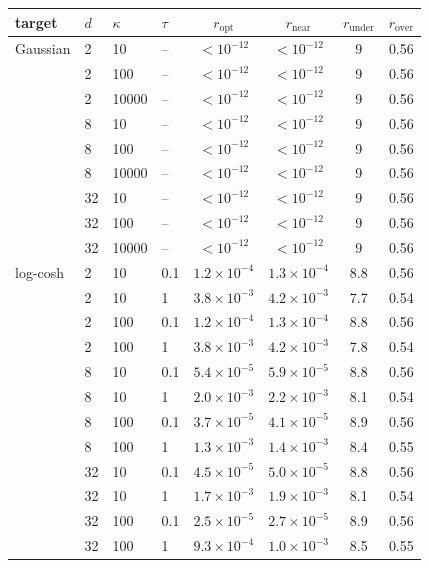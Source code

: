 \begin{tabular}{llll cccc}
\toprule
target & $d$ & $\kappa$ & $\tau$ & $r_{\mathrm{opt}}$ & $r_{\mathrm{near}}$ & $r_{\mathrm{under}}$ & $r_{\mathrm{over}}$ \\
\midrule
Gaussian & 2 & 10 & -- & $<\!10^{-12}$ & $<\!10^{-12}$ & 9 & 0.56 \\
 & 2 & 100 & -- & $<\!10^{-12}$ & $<\!10^{-12}$ & 9 & 0.56 \\
 & 2 & 10000 & -- & $<\!10^{-12}$ & $<\!10^{-12}$ & 9 & 0.56 \\
 & 8 & 10 & -- & $<\!10^{-12}$ & $<\!10^{-12}$ & 9 & 0.56 \\
 & 8 & 100 & -- & $<\!10^{-12}$ & $<\!10^{-12}$ & 9 & 0.56 \\
 & 8 & 10000 & -- & $<\!10^{-12}$ & $<\!10^{-12}$ & 9 & 0.56 \\
 & 32 & 10 & -- & $<\!10^{-12}$ & $<\!10^{-12}$ & 9 & 0.56 \\
 & 32 & 100 & -- & $<\!10^{-12}$ & $<\!10^{-12}$ & 9 & 0.56 \\
 & 32 & 10000 & -- & $<\!10^{-12}$ & $<\!10^{-12}$ & 9 & 0.56 \\
\midrule
log-cosh & 2 & 10 & 0.1 & $1.2\times10^{-4}$ & $1.3\times10^{-4}$ & 8.8 & 0.56 \\
 & 2 & 10 & 1 & $3.8\times10^{-3}$ & $4.2\times10^{-3}$ & 7.7 & 0.54 \\
 & 2 & 100 & 0.1 & $1.2\times10^{-4}$ & $1.3\times10^{-4}$ & 8.8 & 0.56 \\
 & 2 & 100 & 1 & $3.8\times10^{-3}$ & $4.2\times10^{-3}$ & 7.8 & 0.54 \\
 & 8 & 10 & 0.1 & $5.4\times10^{-5}$ & $5.9\times10^{-5}$ & 8.8 & 0.56 \\
 & 8 & 10 & 1 & $2.0\times10^{-3}$ & $2.2\times10^{-3}$ & 8.1 & 0.54 \\
 & 8 & 100 & 0.1 & $3.7\times10^{-5}$ & $4.1\times10^{-5}$ & 8.9 & 0.56 \\
 & 8 & 100 & 1 & $1.3\times10^{-3}$ & $1.4\times10^{-3}$ & 8.4 & 0.55 \\
 & 32 & 10 & 0.1 & $4.5\times10^{-5}$ & $5.0\times10^{-5}$ & 8.8 & 0.56 \\
 & 32 & 10 & 1 & $1.7\times10^{-3}$ & $1.9\times10^{-3}$ & 8.1 & 0.54 \\
 & 32 & 100 & 0.1 & $2.5\times10^{-5}$ & $2.7\times10^{-5}$ & 8.9 & 0.56 \\
 & 32 & 100 & 1 & $9.3\times10^{-4}$ & $1.0\times10^{-3}$ & 8.5 & 0.55 \\
\bottomrule
\end{tabular}
